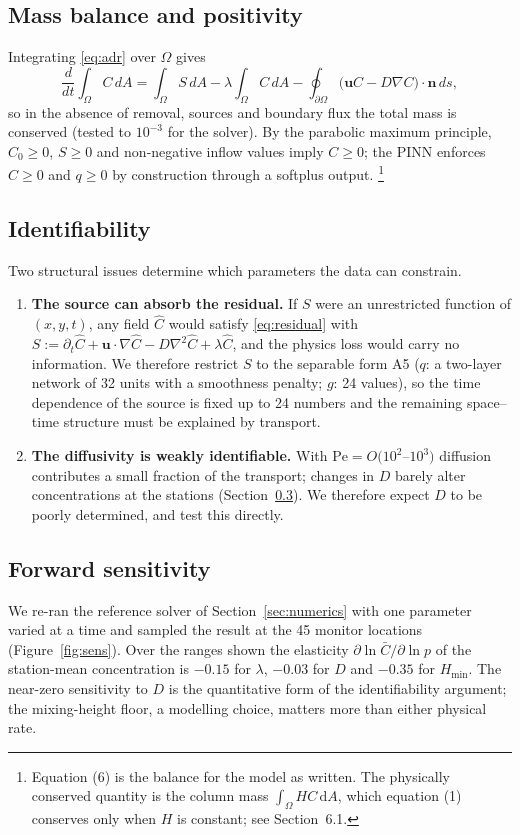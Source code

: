 \documentclass[11pt,a4paper]{article}
\begin{document}
\subsection{Mass balance and positivity}
Integrating \eqref{eq:adr} over $\Omega$ gives
\begin{equation}
\frac{d}{dt}\int_\Omega C\,dA = \int_\Omega S\,dA - \lambda\int_\Omega C\,dA - \oint_{\partial\Omega}\bigl(\bm uC - D\nabla C\bigr)\cdot\bm n\,ds,
\end{equation}
so in the absence of removal, sources and boundary flux the total mass is conserved (tested to $10^{-3}$ for
the solver). By the parabolic maximum principle, $C_0\ge0$, $S\ge0$ and non-negative inflow values imply
$C\ge0$; the PINN enforces $C\ge0$ and $q\ge0$ by construction through a softplus output.
\footnote{Equation (6) is the balance for the model as written. The physically
conserved quantity is the column mass $\int_\Omega HC\,\mathrm{d}A$, which
equation (1) conserves only when $H$ is constant; see Section~6.1.}

\subsection{Identifiability}
Two structural issues determine which parameters the data can constrain.
\begin{enumerate}
\item \textbf{The source can absorb the residual.} If $S$ were an unrestricted function of $(x,y,t)$, any field
$\hat C$ would satisfy \eqref{eq:residual} with $S:=\partial_t\hat C+\bm u\cdot\nabla\hat C-D\nabla^2\hat C+\lambda\hat C$,
and the physics loss would carry no information. We therefore restrict $S$ to the separable form A5
($q$: a two-layer network of 32 units with a smoothness penalty; $g$: 24 values), so the time dependence of the
source is fixed up to 24 numbers and the remaining space--time structure must be explained by transport.
\item \textbf{The diffusivity is weakly identifiable.} With $\mathrm{Pe}=O(10^2$--$10^3)$ diffusion contributes a
small fraction of the transport; changes in $D$ barely alter concentrations at the stations
(Section~\ref{sec:sens}). We therefore expect $D$ to be poorly determined, and test this directly.
\end{enumerate}

\subsection{Forward sensitivity}
\label{sec:sens}
We re-ran the reference solver of Section~\ref{sec:numerics} with one parameter varied at a time and sampled
the result at the 45 monitor locations (Figure~\ref{fig:sens}). Over the ranges shown the elasticity
$\partial\ln\bar C/\partial\ln p$ of the station-mean concentration is $-0.15$ for $\lambda$, $-0.03$ for $D$ and
$-0.35$ for $H_{\min}$. The near-zero sensitivity to $D$ is the quantitative form of the identifiability
argument; the mixing-height floor, a modelling choice, matters more than either physical rate.
\end{document}
